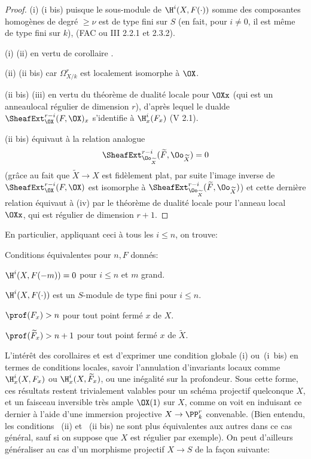 \begin{proof}
(i) \SSI (i bis) puisque le sous-module de $\H^i(X, F(\cdot))$ somme des composantes homog\`enes de degr\'e $\geq \nu$ est de type fini sur $S$ (en fait, pour $i\neq 0$, il est m\^eme de type fini sur $k$), (\cf FAC ou \EGA III 2.2.1 et 2.3.2).

(i) \SSI (ii) en vertu de corollaire .

(ii) \SSI (ii bis) car $\Omega_{X/k}^r$ est localement isomorphe \`a $\OX$.

(ii bis) \SSI (iii) en vertu du th\'eor\`eme de dualit\'e locale pour $\OXx$ (qui est un anneau\pageoriginale local r\'egulier de dimension $r$), d'apr\`es lequel le \og dual\fg de $\SheafExt^{r-i}_{\OX}(F, \OX)_x$ s'identifie \`a $\H^i_x(F_x)$ (V 2.1).

(ii bis) \'equivaut \`a la relation analogue
\[
\SheafExt^{r-i}_{\Oo_{\widetilde{X}}}(\widetilde{F}, \Oo_{\widetilde{X}})=0
\]
(gr\^ace au fait que $\widetilde{X}\to X$ est fid\`element plat, par suite l'image inverse de $\SheafExt^{r-i}_{\OX}(F, \OX)$ est isomorphe \`a $\SheafExt^{r-i}_{\Oo_{\widetilde{X}}}(\widetilde{F}, \Oo_{\widetilde{X}})$) et cette derni\`ere relation \'equivaut \`a (iv) par le th\'eor\`eme de dualit\'e locale pour l'anneau local $\OXx$, qui est r\'egulier de dimension $r+1$.
\skipqed
\end{proof}

En particulier, appliquant ceci \`a tous les $i\leq n$, on trouve:

\begin{corollaire} \label{XII.1.4}
Conditions \'equivalentes pour $n, F$ donn\'es:
\begin{enumeratei}
\item
$\H^i(X, F(-m))=0$ pour $i\leq n$ et $m$ grand.
\item[\textup{(i bis)}] $\H^i(X, F(\cdot))$ est un $S$-module de type fini pour $i\leq n$.
\item
$\prof(F_x)>n$ pour tout point ferm\'e $x$ de $X$.
\item
$\prof(\widetilde{F}_x)>n+1$ pour tout point ferm\'e $x$ de $\widetilde{X}$.
\end{enumeratei}
\end{corollaire}

L'int\'er\^et des corollaires  et  est d'exprimer une condition globale (i) ou~(i~bis) en termes de conditions locales,  savoir l'annulation d'invariants locaux comme $\H_x^i(X, F_x)$ ou $\H_x^i(X, \widetilde{F}_x)$, ou une in\'egalit\'e sur la profondeur. Sous cette forme, ces r\'esultats restent trivialement valables pour un sch\'ema projectif quelconque $X$, et un faisceau inversible tr\`es ample $\OX(1)$ sur $X$, comme on voit en induisant ce dernier \`a l'aide d'une immersion projective $X\to\PP_k^r$ convenable. (Bien entendu, les conditions ~(ii) et ~(ii bis) ne sont plus \'equivalentes aux autres dans ce cas g\'en\'eral, sauf si on suppose que $X$ est r\'egulier par exemple). On peut d'ailleurs g\'en\'eraliser au cas d'un morphisme projectif $X\to S$ de la fa\c con suivante:

